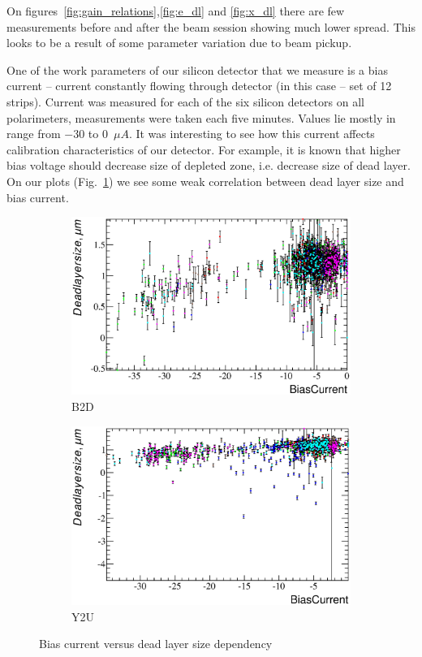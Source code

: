 \documentclass[a4paper,12pt]{article}
\begin{document}
On figures~\ref{fig:gain_relations},\ref{fig:e_dl} and \ref{fig:x_dl} there are few measurements
before and after the beam session showing much lower spread. This looks to be a result of some
parameter variation due to beam pickup.

One of the work parameters of our silicon detector that we measure is a bias current -- current
constantly flowing through detector (in this case -- set of 12 strips). Current was measured
for each of the six silicon detectors on all polarimeters, measurements were taken each five
minutes. Values lie mostly in range from $-30$ to $0$~$\mu A$. It was interesting to see how
this current affects calibration characteristics of our detector. For example, it is known 
that higher bias voltage should decrease size of depleted zone, i.e. decrease size of dead layer.
On our plots (Fig.~\ref{fig:bc_vs_xdl}) we see some weak correlation between dead layer size and bias
current.

\newcommand\bcvsxdllabel{Bias current versus dead layer size dependency}
\begin{figure}[p]
\begin{subfigure}[t]{0.5\textwidth}
\includegraphics[width=\textwidth]{gfx/run13_alpha_study/B2D/c_hBiasCurrent_DeadLayerSize.eps}
\caption{B2D}
\end{subfigure}
%
\begin{subfigure}[t]{0.5\textwidth}
\includegraphics[width=\textwidth]{gfx/run13_alpha_study/Y2U/c_hBiasCurrent_DeadLayerSize.eps}
\caption{Y2U}
\end{subfigure}
\caption{\bcvsxdllabel}
\label{fig:bc_vs_xdl}
\end{figure}
\end{document}
